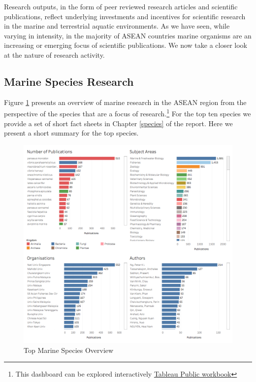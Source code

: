 \documentclass[]{book}
\theoremstyle{definition}
\theoremstyle{definition}
\theoremstyle{definition}
\theoremstyle{remark}
\begin{document}
Research outputs, in the form of peer reviewed research articles and
scientific publications, reflect underlying investments and incentives
for scientific research in the marine and terrestrial aquatic
environments. As we have seen, while varying in intensity, in the
majority of ASEAN countries marine organisms are an increasing or
emerging focus of scientific publications. We now take a closer look at
the nature of research activity.

\hypertarget{marine-species-research}{%
\subsection{Marine Species Research}\label{marine-species-research}}

Figure \ref{fig:taxonomysubjectarea} presents an overview of marine
research in the ASEAN region from the perspective of the species that
are a focus of research.\footnote{This dashboard can be explored
  interactively \href{link}{Tableau Public workbook}} For the top ten
species we provide a set of short fact sheets in Chapter \ref{species}
of the report. Here we present a short summary for the top species.

\begin{figure}

{\centering \includegraphics[width=1\linewidth]{images/aseanmarinlit_species_overview} 

}

\caption{Top Marine Species Overview}\label{fig:taxonomysubjectarea}
\end{figure}
\end{document}
